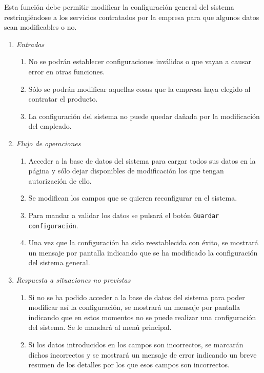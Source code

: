   \label{fun:configSystem}
	Esta función debe permitir modificar la configuración general del sistema restringiéndose a los servicios contratados por la empresa para que algunos datos sean modificables o no.

	\begin{enumerate}
		\item \textit{Entradas}
		\begin{enumerate}
			\item No se podrán establecer configuraciones inválidas o que vayan a causar error en otras funciones.
			\item Sólo se podrán modificar aquellas cosas que la empresa haya elegido al contratar el producto.
			\item La configuración del sistema no puede quedar dañada por la modificación del empleado.
		\end{enumerate}
		\item \textit{Flujo de operaciones}
		\begin{enumerate}
			\item Acceder a la base de datos del sistema para cargar todos sus datos en la página y sólo dejar disponibles de modificación los que tengan autorización de ello.
			\item Se modifican los campos que se quieren reconfigurar en el sistema.
			\item Para mandar a validar los datos se pulsará el botón \verb|Guardar configuración|. 
			\item Una vez que la configuración ha sido reestablecida con éxito, se mostrará un mensaje por pantalla indicando que se ha modificado la configuración del sistema general.
		\end{enumerate}
		\item \textit{Respuesta a situaciones no previstas}
		\begin{enumerate}
		  \item Si no se ha podido acceder a la base de datos del sistema para poder modificar así la configuración, se mostrará un mensaje por pantalla indicando que en estos momentos no se puede realizar una configuración del sistema. Se le mandará al menú principal.
			\item Si los datos introducidos en los campos son incorrectos, se marcarán dichos incorrectos y se mostrará un mensaje de error indicando un breve resumen de los detalles por los que esos campos son incorrectos.
		\end{enumerate}

	\end{enumerate}

